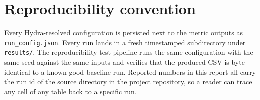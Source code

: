 \section{Reproducibility convention}

Every Hydra-resolved configuration is persisted next to the metric outputs as \texttt{run\_config.json}. Every run lands in a fresh timestamped subdirectory under \texttt{results/}. The reproducibility test pipeline runs the same configuration with the same seed against the same inputs and verifies that the produced CSV is byte-identical to a known-good baseline run. Reported numbers in this report all carry the run id of the source directory in the project repository, so a reader can trace any cell of any table back to a specific run.

